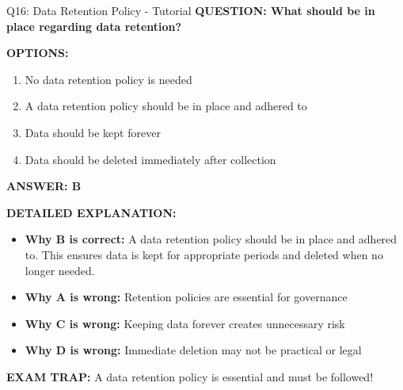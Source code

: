 \documentclass[8pt]{beamer}
\begin{document}
	\begin{frame}{Q16: Data Retention Policy - Tutorial}
		\fontsize{6.5}{7.5}\selectfont
		\textbf{QUESTION: What should be in place regarding data retention?}
		
		\vspace{0.1cm}
		\textbf{OPTIONS:}
		\begin{enumerate}
			\item No data retention policy is needed
			\item A data retention policy should be in place and adhered to
			\item Data should be kept forever
			\item Data should be deleted immediately after collection
		\end{enumerate}
		
		\vspace{0.1cm}
		\textcolor{myblue}{\textbf{ANSWER: B}}
		
		\vspace{0.1cm}
		\textbf{DETAILED EXPLANATION:}
		\begin{itemize}
			\item \textbf{Why B is correct:} A data retention policy should be in place and adhered to. This ensures data is kept for appropriate periods and deleted when no longer needed.
			\item \textbf{Why A is wrong:} Retention policies are essential for governance
			\item \textbf{Why C is wrong:} Keeping data forever creates unnecessary risk
			\item \textbf{Why D is wrong:} Immediate deletion may not be practical or legal
		\end{itemize}
		
		\textcolor{myred}{\textbf{EXAM TRAP:}} A data retention policy is \textcolor{myblue}{essential and must be followed}!
	\end{frame}
	
\end{document}
